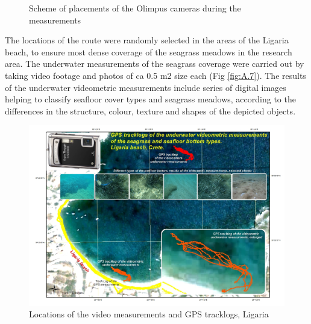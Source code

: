 \documentclass[10pt, a4paper]{article}
\begin{document}
\begin{figure}[H]
	\centering
	\caption{Scheme of placements of the Olimpus cameras during the measurements}
	\label{fig:3.5}
\end{figure}
The locations of the route were randomly selected in the areas of the Ligaria beach, to ensure most dense
coverage of the seagrass meadows in the research area. The underwater measurements of the seagrass
coverage were carried out by taking video footage and photos of ca 0.5 m2 size each (Fig \ref{fig:A.7}).
The results of the underwater videometric measurements include series of digital images helping to
classify seafloor cover types and seagrass meadows, according to the differences in the structure,
colour, texture and shapes of the depicted objects.

\begin{figure}[H]
	\centering
	\includegraphics[scale=0.40]{Fig-21.jpg}
	\caption{Locations of the video measurements and GPS tracklogs, Ligaria}
	\label{fig:3.6}
\end{figure}
\end{document}
